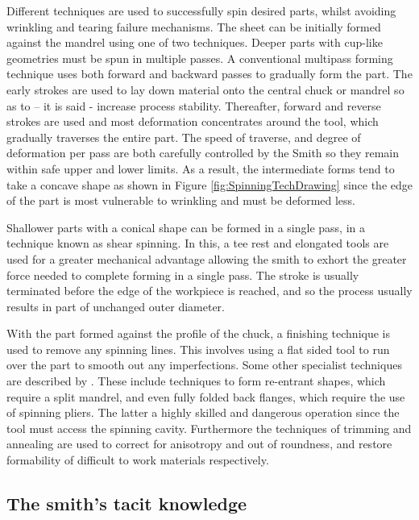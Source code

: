 Different techniques are used to successfully spin desired parts, whilst avoiding wrinkling and tearing failure mechanisms. The sheet can be initially formed against the mandrel using one of two techniques. Deeper parts with cup-like geometries must be spun in multiple passes. A conventional multipass forming technique uses both forward and backward passes to gradually form the part. The early strokes are used to lay down material onto the central chuck or mandrel so as to – it is said - increase process stability. Thereafter, forward and reverse strokes are used and most deformation concentrates around the tool, which gradually traverses the entire part. The speed of traverse, and degree of deformation per pass are both carefully controlled by the Smith so they remain within safe upper and lower limits. As a result, the intermediate forms tend to take a concave shape as shown in Figure \ref{fig:SpinningTechDrawing} since the edge of the part is most vulnerable to wrinkling and must be deformed less. 

Shallower parts with a conical shape can be formed in a single pass, in a technique known as shear spinning. In this, a tee rest and elongated tools are used for a greater mechanical advantage allowing the smith to exhort the greater force needed to complete forming in a single pass. The stroke is usually terminated before the edge of the workpiece is reached, and so the process usually results in part of unchanged outer diameter. 

With the part formed against the profile of the chuck, a finishing technique is used to remove any spinning lines.  This involves using a flat sided tool to run over the part to smooth out any imperfections.  Some other specialist techniques are described by \citep{Wiley2004TheHand-spinning}.  These include techniques to form re-entrant shapes, which require a split mandrel, and even fully folded back flanges, which require the use of spinning pliers. The latter a highly skilled and dangerous operation since the tool must access the spinning cavity. Furthermore the techniques of trimming and annealing are used to correct for anisotropy and out of roundness, and restore formability of difficult to work materials respectively.  




\subsection{The smith's tacit knowledge} \label{sec:tacitknowledge}

